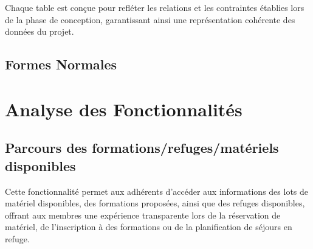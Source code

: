 Chaque table est conçue pour refléter les relations et les contraintes établies lors de la phase de conception, garantissant ainsi une représentation cohérente des données du projet.

\subsection{Formes Normales}

\section{Analyse des Fonctionnalités}

\subsection{Parcours des formations/refuges/matériels disponibles}

\par Cette fonctionnalité permet aux adhérents d'accéder aux informations des lots de matériel disponibles, des formations proposées, ainsi que des refuges disponibles, offrant aux membres une expérience transparente lors de la réservation de matériel, de l'inscription à des formations ou de la planification de séjours en refuge.

